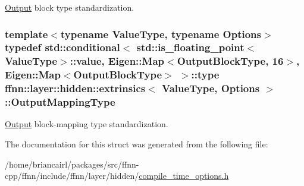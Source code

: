 \hyperlink{classffnn_1_1layer_1_1_output}{Output} block type standardization. 

\hypertarget{structffnn_1_1layer_1_1hidden_1_1extrinsics_a886b2e28314f8641f14407a84af8132c}{
\subsubsection[{Output\-Mapping\-Type}]{\setlength{\rightskip}{0pt plus 5cm}template$<$typename Value\-Type, typename Options$>$ typedef std\-::conditional$<$ std\-::is\-\_\-floating\-\_\-point$<$Value\-Type$>$\-::value, Eigen\-::\-Map$<${\bf Output\-Block\-Type}, 16$>$, Eigen\-::\-Map$<${\bf Output\-Block\-Type}$>$ $>$\-::type {\bf ffnn\-::layer\-::hidden\-::extrinsics}$<$ Value\-Type, Options $>$\-::{\bf Output\-Mapping\-Type}}}\label{structffnn_1_1layer_1_1hidden_1_1extrinsics_a886b2e28314f8641f14407a84af8132c}


\hyperlink{classffnn_1_1layer_1_1_output}{Output} block-\/mapping type standardization. 



The documentation for this struct was generated from the following file\-:\begin{DoxyCompactItemize}
\item 
/home/briancairl/packages/src/ffnn-\/cpp/ffnn/include/ffnn/layer/hidden/\hyperlink{hidden_2compile__time__options_8h}{compile\-\_\-time\-\_\-options.\-h}\end{DoxyCompactItemize}
